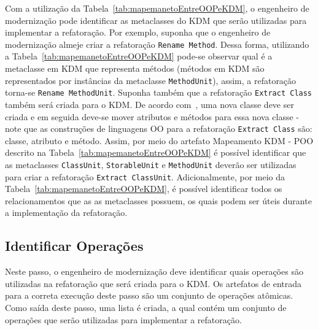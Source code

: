 Com a utilização da Tabela~\ref{tab:mapemanetoEntreOOPeKDM}, o engenheiro de modernização pode identificar as metaclasses do KDM que serão utilizadas para implementar a refatoração. %
Por exemplo, suponha que o engenheiro de modernização almeje criar a refatoração \texttt{Rename Method}. Dessa forma, utilizando a Tabela~\ref{tab:mapemanetoEntreOOPeKDM} pode-se observar qual é a metaclasse em KDM que representa métodos (métodos em KDM são representados por instâncias da metaclasse \texttt{MethodUnit}), assim, a refatoração torna-se \texttt{Rename MethodUnit}. Suponha também que a refatoração \texttt{Extract Class} também será criada para o KDM. De acordo com~, uma nova classe deve ser criada e em seguida deve-se mover atributos e métodos para essa nova classe - note que as construções de linguagens OO para a refatoração \texttt{Extract Class} são: classe, atributo e método. Assim, por meio do artefato Mapeamento KDM - POO descrito na Tabela~\ref{tab:mapemanetoEntreOOPeKDM} é possível identificar que as metaclasses \texttt{ClassUnit}, \texttt{StorableUnit} e \texttt{MethodUnit} deverão ser utilizadas para criar a refatoração \texttt{Extract ClassUnit}. Adicionalmente, por meio da Tabela~\ref{tab:mapemanetoEntreOOPeKDM}, é possível identificar todos os relacionamentos que as as metaclasses possuem, os quais podem ser úteis durante a implementação da refatoração.


\subsection{Identificar Operações}\label{sec:refatoracao_para_o_metamodelo_kdm}

Neste passo, o engenheiro de modernização deve identificar quais operações são utilizadas na refatoração que será criada para o KDM. Os artefatos de entrada para a correta execução deste passo são um conjunto de operações atômicas. Como saída deste passo, uma lista é criada, a qual contém um conjunto de operações que serão utilizadas para implementar a refatoração.


